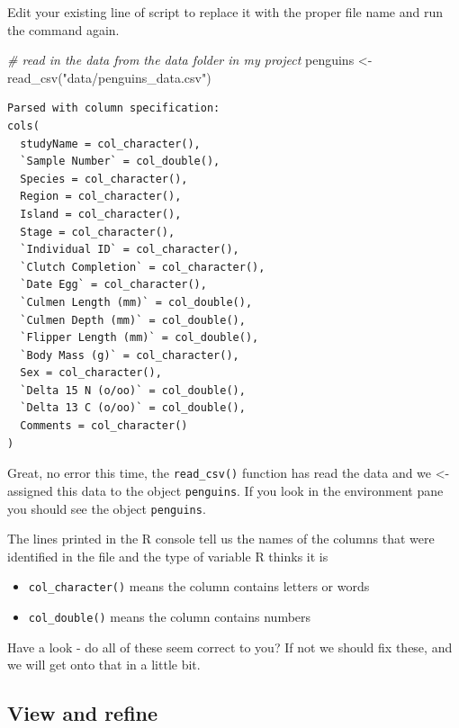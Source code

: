 \documentclass[
]{book}
\makeatletter
\newenvironment{Shaded}{\begin{snugshade}}{\end{snugshade}}
\newcommand{\CommentTok}[1]{\textcolor[rgb]{0.56,0.35,0.01}{\textit{#1}}}
\newcommand{\FunctionTok}[1]{\textcolor[rgb]{0.00,0.00,0.00}{#1}}
\newcommand{\NormalTok}[1]{#1}
\newcommand{\OtherTok}[1]{\textcolor[rgb]{0.56,0.35,0.01}{#1}}
\newcommand{\StringTok}[1]{\textcolor[rgb]{0.31,0.60,0.02}{#1}}
\newenvironment{kframe}{%
\medskip{}
\setlength{\fboxsep}{.8em}
 \def\at@end@of@kframe{}%
 \ifinner\ifhmode%
  \def\at@end@of@kframe{\end{minipage}}%
  \begin{minipage}{\columnwidth}%
 \fi\fi%
 \def\FrameCommand##1{\hskip\@totalleftmargin \hskip-\fboxsep
 \colorbox{shadecolor}{##1}\hskip-\fboxsep
     \hskip-\linewidth \hskip-\@totalleftmargin \hskip\columnwidth}%
 \MakeFramed {\advance\hsize-\width
   \@totalleftmargin\z@ \linewidth\hsize
   \@setminipage}}%
 {\par\unskip\endMakeFramed%
 \at@end@of@kframe}
\newenvironment{block}[1]
  {
  \begin{itemize}
  \renewcommand{\labelitemi}{
    \raisebox{-.7\height}[0pt][0pt]{
      {\setkeys{Gin}{width=3em,keepaspectratio}\texttt{[image: images/\#1]}}
    }
  }
  \setlength{\fboxsep}{1em}
  \begin{kframe}
  \item
  }
  {
  \end{kframe}
  \end{itemize}
  }
\newenvironment{rmdquestion}
  {\begin{block}{question}}
  {\end{block}}
\makeatother
\begin{document}
Edit your existing line of script to replace it with the proper file name and run the command again.

\begin{Shaded}
\begin{Highlighting}[]
\CommentTok{\# read in the data from the data folder in my project}
\NormalTok{penguins }\OtherTok{\textless{}{-}} \FunctionTok{read\_csv}\NormalTok{(}\StringTok{"data/penguins\_data.csv"}\NormalTok{)}
\end{Highlighting}
\end{Shaded}

\begin{verbatim}
Parsed with column specification:
cols(
  studyName = col_character(),
  `Sample Number` = col_double(),
  Species = col_character(),
  Region = col_character(),
  Island = col_character(),
  Stage = col_character(),
  `Individual ID` = col_character(),
  `Clutch Completion` = col_character(),
  `Date Egg` = col_character(),
  `Culmen Length (mm)` = col_double(),
  `Culmen Depth (mm)` = col_double(),
  `Flipper Length (mm)` = col_double(),
  `Body Mass (g)` = col_character(),
  Sex = col_character(),
  `Delta 15 N (o/oo)` = col_double(),
  `Delta 13 C (o/oo)` = col_double(),
  Comments = col_character()
)
\end{verbatim}

Great, no error this time, the \texttt{read\_csv()} function has read the data and we \textless- assigned this data to the object \texttt{penguins}. If you look in the environment pane you should see the object \texttt{penguins}.

The lines printed in the R console tell us the names of the columns that were identified in the file and the type of variable R thinks it is

\begin{itemize}
\item
  \texttt{col\_character()} means the column contains letters or words
\item
  \texttt{col\_double()} means the column contains numbers
\end{itemize}

\begin{rmdquestion}
Have a look - do all of these seem correct to you? If not we should fix
these, and we will get onto that in a little bit.
\end{rmdquestion}

\hypertarget{view-and-refine}{%
\subsection{View and refine}\label{view-and-refine}}
\end{document}
